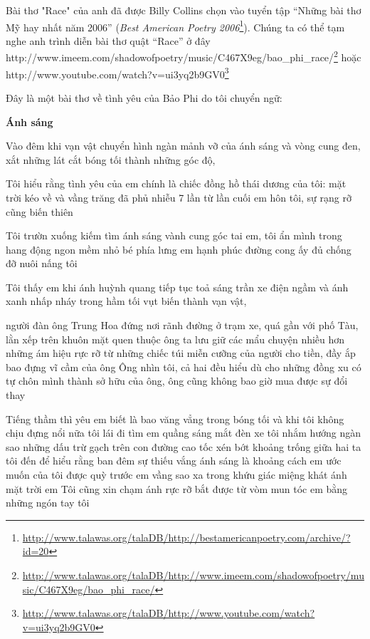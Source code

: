 \documentclass[../main.tex]{subfiles}
\begin{document}
\begin{multicols}{2}
Bài thơ "Race" của anh đã được Billy Collins chọn vào tuyển tập “Những bài thơ Mỹ hay nhất năm 2006” (\textit{Best American Poetry 2006}\footnote{\url{http://www.talawas.org/talaDB/http://bestamericanpoetry.com/archive/?id=20}}). Chúng ta có thể tạm nghe anh trình diễn bài thơ quật “Race” ở đây http://www.imeem.com/shadowofpoetry/music/C467X9eg/bao_phi_race/\footnote{\url{http://www.talawas.org/talaDB/http://www.imeem.com/shadowofpoetry/music/C467X9eg/bao_phi_race/}}  
hoặc  http://www.youtube.com/watch?v=ui3yq2b9GV0\footnote{\url{http://www.talawas.org/talaDB/http://www.youtube.com/watch?v=ui3yq2b9GV0}} 
 
Đây là một bài thơ về tình yêu của Bảo Phi do tôi chuyển ngữ: 
\begin{blockquote}
 
\textbf{Ánh sáng} 
        
Vào đêm        
khi vạn vật chuyển hình ngàn mảnh vỡ        
của ánh sáng        
và vòng cung đen,        
xắt những lát cắt bóng tối        
thành những góc độ, 
        
Tôi hiểu rằng tình yêu của em chính là chiếc đồng hồ thái dương của tôi:        
mặt trời kéo về và vầng trăng đã phủ nhiễu 7 lần        
từ lần cuối em hôn tôi,        
sự rạng rỡ cũng biến thiên 
        
Tôi trườn xuống        
kiếm tìm ánh sáng vành cung        
góc tai em,        
tôi ẩn mình        
trong hang động ngon mềm nhỏ bé phía lưng em        
hạnh phúc đường cong ấy đủ chống đỡ nuôi nấng tôi 
        
Tôi thấy em khi ánh huỳnh quang tiếp tục toả sáng        
trần xe điện ngầm và ánh xanh nhấp nháy        
trong hầm tối vụt biến thành vạn vật, 
        
người đàn ông Trung Hoa        
đứng nơi rãnh đường ở trạm xe, quá gần        
với phố Tàu,        
lằn xếp trên khuôn mặt quen thuộc ông ta        
lưu giữ các mẩu chuyện nhiều hơn         
những ám hiệu rực rỡ        
từ những chiếc túi miễn cưỡng        
của người cho tiền, đầy ắp bao đựng vĩ cầm của ông        
Ông nhìn tôi, cả hai đều hiểu         
dù cho những đồng xu có tự chôn mình thành sở hữu của ông,        
ông cũng không bao giờ mua được sự đổi thay 
        
Tiếng thầm thì yêu em biết là bao         
văng vẳng trong bóng tối        
và khi tôi không chịu đựng nổi nữa         
tôi lái đi tìm em        
quầng sáng mắt đèn xe tôi nhắm hướng ngàn sao        
những dấu trừ gạch trên        
con đường cao tốc xén bớt khoảng trống giữa hai ta         
tôi đến để hiểu rằng ban đêm         
sự thiếu vắng ánh sáng         
là khoảng cách em        
ước muốn của tôi        
được quỳ trước em        
vầng sao xa trong khứu giác        
miệng khát        
ánh mặt trời em        
Tôi cũng xin chạm ánh rực rỡ        
bắt được từ vòm mun tóc em        
bằng những ngón tay tôi 
        

\end{blockquote}
\end{multicols}
\end{document}
